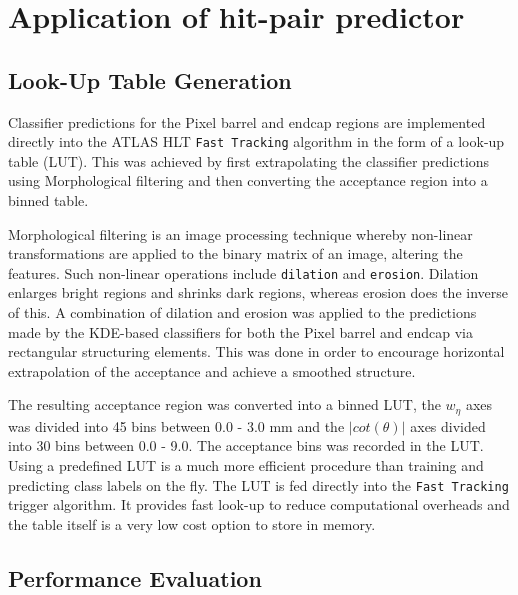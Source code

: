 \section{Application of hit-pair predictor}
\label{application-of-hit-pair-predictor}

\subsection{Look-Up Table Generation}

Classifier predictions for the Pixel barrel and endcap regions are implemented directly into the ATLAS HLT \texttt{Fast Tracking} algorithm in the form of a look-up table (LUT). This was achieved by first extrapolating the classifier predictions using Morphological filtering and then converting the acceptance region into a binned table.

Morphological filtering is an image processing technique whereby non-linear transformations are applied to the binary matrix of an image, altering the features. Such non-linear operations include \texttt{dilation} and \texttt{erosion}. Dilation enlarges bright regions and shrinks dark regions, whereas erosion does the inverse of this. A combination of dilation and erosion was applied to the predictions made by the KDE-based classifiers for both the Pixel barrel and endcap via rectangular structuring elements. This was done in order to encourage horizontal extrapolation of the acceptance and achieve a smoothed structure. 

The resulting acceptance region was converted into a binned LUT, the $w_{\eta}$ axes was divided into 45 bins between 0.0 - 3.0 mm and the $\lvert cot(\theta) \rvert$ axes divided into 30 bins between 0.0 - 9.0. The acceptance bins was recorded in the LUT. Using a predefined LUT is a much more efficient procedure than training and predicting class labels on the fly. The LUT is fed directly into the \texttt{Fast Tracking} trigger algorithm. It provides fast look-up to reduce computational overheads and the table itself is a very low cost option to store in memory. 







\subsection{Performance Evaluation}

